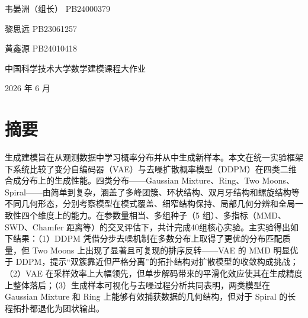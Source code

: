 \documentclass[UTF8,a4paper,12pt]{ctexart}
\begin{document}
\begin{titlepage}
\centering
\vspace*{3.0cm}

{\bfseries\color{warmprimary}\par}

\vspace{1.8cm}

{韦晏洲（组长） \quad PB24000379 \par}
\vspace{0.5cm}
{黎思远 \quad PB23061257 \par}
\vspace{0.5cm}
{黄鑫源 \quad PB24010418 \par}

\vfill

{中国科学技术大学\quad 数学建模课程大作业\par}
\vspace{0.5cm}
{2026 年 6 月\par}

\vspace{1.0cm}
\end{titlepage}

\tableofcontents
\clearpage

\section*{摘要}

生成建模旨在从观测数据中学习概率分布并从中生成新样本。本文在统一实验框架下系统比较了变分自编码器（VAE）与去噪扩散概率模型（DDPM）在四类二维合成分布上的生成性能。四类分布——Gaussian Mixture、Ring、Two Moons、Spiral——由简单到复杂，涵盖了多峰团簇、环状结构、双月牙结构和螺旋结构等不同几何形态，分别考察模型在模式覆盖、细窄结构保持、局部几何分辨和全局一致性四个维度上的能力。在参数量相当、多组种子（5 组）、多指标（MMD、SWD、Chamfer 距离等）的交叉评估下，共计完成40组核心实验。主实验得出如下结果：（1）DDPM 凭借分步去噪机制在多数分布上取得了更优的分布匹配质量，但 Two Moons 上出现了显著且可复现的排序反转——VAE 的 MMD 明显优于 DDPM，提示“双簇靠近但严格分离”的拓扑结构对扩散模型的收敛构成挑战；（2）VAE 在采样效率上大幅领先，但单步解码带来的平滑化效应使其在生成精度上整体落后；（3）生成样本可视化与去噪过程分析共同表明，两类模型在 Gaussian Mixture 和 Ring 上能够有效捕获数据的几何结构，但对于 Spiral 的长程拓扑都退化为团状输出。
\end{document}
